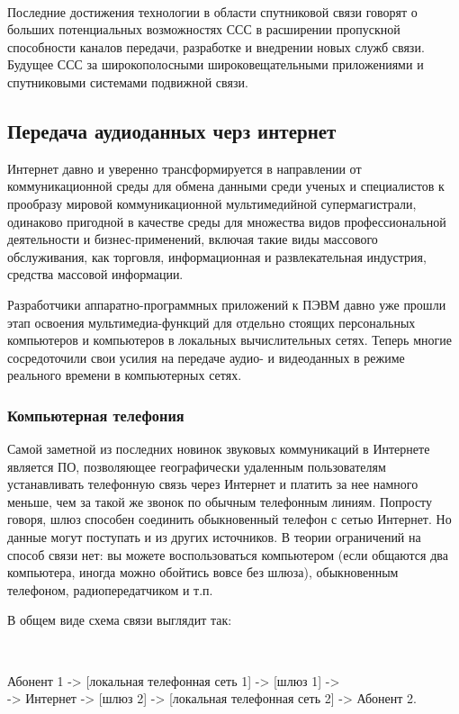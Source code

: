 \documentclass[a4paper]{report}
\begin{document}
~

Последние достижения технологии в области спутниковой связи говорят о больших потенциальных возможностях ССС в расширении пропускной способности каналов передачи, разработке и внедрении новых служб связи. Будущее ССС за широкополосными широковещательными приложениями и спутниковыми системами подвижной связи.


\subsection{Передача аудиоданных черз интернет}
Интернет давно и уверенно трансформируется в направлении от коммуникационной среды для обмена данными среди ученых и специалистов к прообразу мировой коммуникационной мультимедийной супермагистрали, одинаково пригодной в качестве среды для множества видов профессиональной деятельности и бизнес-применений, включая такие виды массового обслуживания, как торговля, информационная и развлекательная индустрия, средства массовой информации.

Разработчики аппаратно-программных приложений к ПЭВМ давно уже прошли этап освоения мультимедиа-функций для отдельно стоящих персональных компьютеров и компьютеров в локальных вычислительных сетях. Теперь многие сосредоточили свои усилия на передаче аудио- и видеоданных в режиме реального времени в компьютерных сетях. 

\subsubsection{Компьютерная телефония}
Самой заметной из последних новинок звуковых коммуникаций в Интернете является ПО, позволяющее географически удаленным пользователям устанавливать телефонную связь через Интернет и платить за нее намного меньше, чем за такой же звонок по обычным телефонным линиям. Попросту говоря, шлюз способен соединить обыкновенный телефон с сетью Интернет. Но данные могут поступать и из других источников. В теории ограничений на способ связи нет: вы можете воспользоваться компьютером (если общаются два компьютера, иногда можно обойтись вовсе без шлюза), обыкновенным телефоном, радиопередатчиком и т.п.

В общем виде схема связи выглядит так:

~

Абонент 1 -> [локальная телефонная сеть 1] -> [шлюз 1] -> \\ -> Интернет -> [шлюз 2] -> [локальная телефонная сеть 2] -> Абонент 2.
\end{document}
